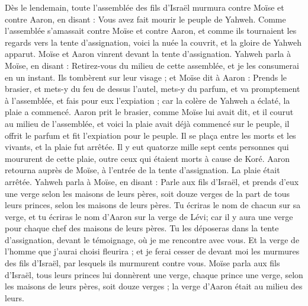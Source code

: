 \begin{multicols}{2}
Dès le lendemain, toute l'assemblée des fils d'Israël murmura contre Moïse et contre Aaron, en disant : Vous avez fait mourir le peuple de Yahweh.
Comme l'assemblée s'amassait contre Moïse et contre Aaron, et comme ils tournaient les regards vers la tente d'assignation, voici la nuée la couvrit, et la gloire de Yahweh apparut.
Moïse et Aaron vinrent devant la tente d'assignation.
Yahweh parla à Moïse, en disant :
Retirez-vous du milieu de cette assemblée, et je les consumerai en un instant. Ils tombèrent sur leur visage ;
et Moïse dit à Aaron : Prends le brasier, et mets-y du feu de dessus l'autel, mets-y du parfum, et va promptement à l'assemblée, et fais pour eux l’expiation ; car la colère de Yahweh a éclaté, la plaie a commencé.
Aaron prit le brasier, comme Moïse lui avait dit, et il courut au milieu de l'assemblée, et voici la plaie avait déjà commencé sur le peuple, il offrit le parfum et fit l’expiation pour le peuple.
Il se plaça entre les morts et les vivants, et la plaie fut arrêtée.
Il y eut quatorze mille sept cents personnes qui moururent de cette plaie, outre ceux qui étaient morts à cause de Koré.
Aaron retourna auprès de Moïse, à l'entrée de la tente d'assignation. La plaie était arrêtée.
\VerseOne{}Yahweh parla à Moïse, en disant :
Parle aux fils d'Israël, et prends d’eux une verge selon les maisons de leurs pères, soit douze verges de la part de tous leurs princes, selon les maisons de leurs pères. Tu écriras le nom de chacun sur sa verge,
et tu écriras le nom d'Aaron sur la verge de Lévi; car il y aura une verge pour chaque chef des maisons de leurs pères.
Tu les déposeras dans la tente d'assignation, devant le témoignage, où je me rencontre avec vous.
Et la verge de l'homme que j'aurai choisi fleurira ; et je ferai cesser de devant moi les murmures des fils d'Israël, par lesquels ils murmurent contre vous.
Moïse parla aux fils d'Israël, tous leurs princes lui donnèrent une verge, chaque prince une verge, selon les maisons de leurs pères, soit douze verges ; la verge d'Aaron était au milieu des leurs.

\end{multicols}

